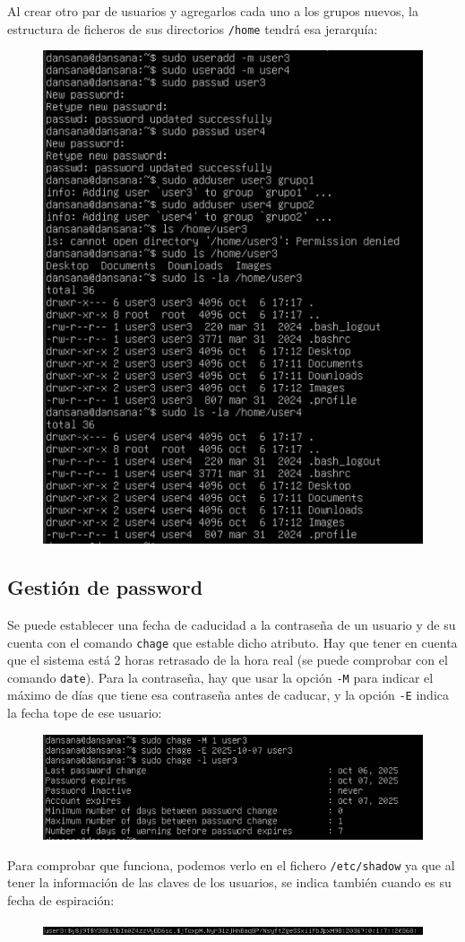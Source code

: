 \documentclass[10pt]{article}
\begin{document}
	Al crear otro par de usuarios y agregarlos cada uno a los grupos nuevos, la estructura de ficheros de sus directorios \verb|/home| tendrá esa jerarquía:
	\begin{figure}[H]
		\setlength{\abovecaptionskip}{0cm}
		\setlength{\belowcaptionskip}{0cm}
		\centering
		\includegraphics[width=0.6\linewidth]{Recursos/skel.png}
	\end{figure}
	\clearpage
	
	\subsection{Gestión de password}
	Se puede establecer una fecha de caducidad a la contraseña de un usuario y de su cuenta con el comando \verb|chage| que estable dicho atributo. Hay que tener en cuenta que el sistema está 2 horas retrasado de la hora real (se puede comprobar con el comando \verb|date|). Para la contraseña, hay que usar la opción \verb|-M| para indicar el máximo de días que tiene esa contraseña antes de caducar, y la opción \verb|-E| indica la fecha tope de ese usuario:
	\begin{figure}[H]
		\setlength{\abovecaptionskip}{0cm}
		\setlength{\belowcaptionskip}{0cm}
		\centering
		\includegraphics[width=0.7\linewidth]{Recursos/chage.png}
	\end{figure}
	Para comprobar que funciona, podemos verlo en el fichero \verb|/etc/shadow| ya que al tener la información de las claves de los usuarios, se indica también cuando es su fecha de espiración:
	\begin{figure}[H]
		\setlength{\abovecaptionskip}{0cm}
		\setlength{\belowcaptionskip}{0cm}
		\centering
		\includegraphics[width=\linewidth]{Recursos/shadowChage.png}
	\end{figure}
	
\end{document}
